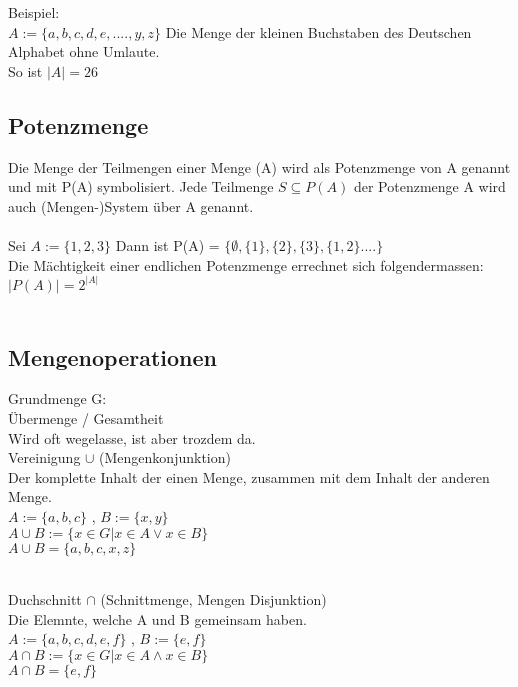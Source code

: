 \documentclass[../gruppenarbeit_1.tex]{subfiles}
\begin{document}
Beispiel:\\
$A := \{a,b,c,d,e,....,y,z\}$ Die Menge der kleinen Buchstaben des Deutschen Alphabet ohne Umlaute.\\
So ist $|A| = 26$\\

\subsection{Potenzmenge}
Die Menge der Teilmengen einer Menge (A) wird als Potenzmenge von A genannt und mit P(A) symbolisiert.
Jede Teilmenge $S \subseteq P(A)$ der Potenzmenge A wird auch (Mengen-)System über A genannt.\\
\\
Sei $A := \{1,2,3\}$ Dann ist P(A) = $\{\emptyset, \{1\},\{2\},\{3\},\{1,2\}....\}$\\
Die Mächtigkeit einer endlichen Potenzmenge errechnet sich folgendermassen:\\
$|P(A)| = 2^{|A|}$\\
\\

\subsection{Mengenoperationen}
Grundmenge G:\\
Übermenge / Gesamtheit\\
Wird oft wegelasse, ist aber trozdem da.
\\

Vereinigung $\cup$ (Mengenkonjunktion)\\
Der komplette Inhalt der einen Menge, zusammen mit dem Inhalt der anderen Menge.\\
$A := \{a,b,c\}$ , $B := \{x,y\}$\\
$A \cup B := \{x \in G | x \in A \vee x \in B\}$\\
$A \cup B = \{a,b,c,x,z\}$\\
\\

\newpage

Duchschnitt $\cap$ (Schnittmenge, Mengen Disjunktion)\\
Die Elemnte, welche A und B gemeinsam haben.\\
$A := \{a,b,c,d,e,f\}$ , $B := \{e,f\}$\\
$A \cap B := \{x \in G | x \in A \wedge x \in B\}$\\
$A \cap B = \{e,f\}$\\
\\
\end{document}
